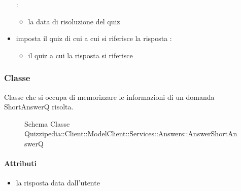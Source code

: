 \begin{itemize}
\newline
{} :
\begin{itemize}
\item {}
\newline
la data di risoluzione del quiz
\end{itemize}
\item {}
\newline
imposta il quiz di cui a cui si riferisce la risposta
\newline
{} :
\begin{itemize}
\item {}
\newline
il quiz a cui la risposta si riferisce
\end{itemize}
\end{itemize}
\subsubsection{Classe }
Classe che si occupa di memorizzare le informazioni di un domanda ShortAnswerQ risolta.
\begin{figure}[H]
\centering
\noindent{}
\caption[Schema Classe AnswerShortAnswerQ]{Schema Classe Quizzipedia::Client::ModelClient::Services::Answers::AnswerShortAnswerQ}
\end{figure}
\paragraph{Attributi}
\begin{itemize}
\item {}
\newline
la risposta data dall'utente
\end{itemize}
